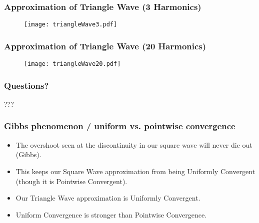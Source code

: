 \documentclass{beamer}
\begin{document}
\begin{frame}[fragile]
   \frametitle{Approximation of Triangle Wave (3 Harmonics)}
   \begin{figure}
   \texttt{[image: triangleWave3.pdf]}
   \end{figure}
\end{frame}

\begin{frame}[fragile]
   \frametitle{Approximation of Triangle Wave (20 Harmonics)}
   \begin{figure}
   \texttt{[image: triangleWave20.pdf]}
   \end{figure}
\end{frame}

\begin{frame}[fragile]
   \frametitle{Questions?}
   \begin{center}
      {\fontsize{50}{60}\selectfont ???}
   \end{center}
\end{frame}

\begin{frame}
   \frametitle{Gibbs phenomenon / uniform vs. pointwise convergence}
   \begin{block}{}
      \begin{itemize}
         \item The overshoot seen at the discontinuity in our square wave will never die out (Gibbs). 
         \item This keeps our Square Wave approximation from being Uniformly Convergent (though it is Pointwise Convergent).
         \item Our Triangle Wave approximation is Uniformly Convergent.
         \item Uniform Convergence is stronger than Pointwise Convergence.
      \end{itemize}
   \end{block}
\end{frame}
\end{document}

